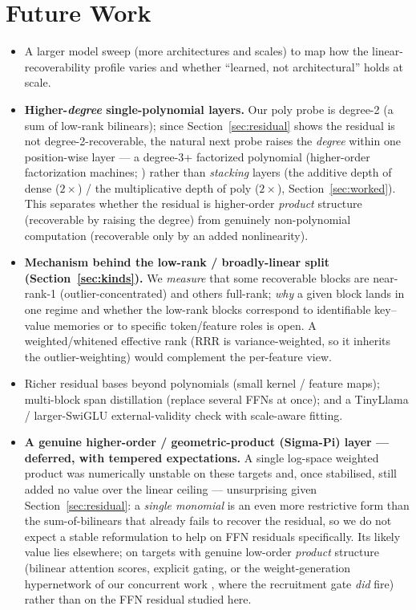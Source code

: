 \documentclass{article}
\begin{document}
\section{Future Work}
\label{sec:future}

\begin{itemize}
\item A larger model sweep (more architectures and scales) to map how the linear-recoverability
  profile varies and whether ``learned, not architectural'' holds at scale.
\item \textbf{Higher-\emph{degree} single-polynomial layers.} Our poly probe is degree-2 (a sum of
  low-rank bilinears); since Section~\ref{sec:residual} shows the residual is not degree-2-recoverable,
  the natural next probe raises the \emph{degree} within one position-wise layer --- a degree-3+
  factorized polynomial (higher-order factorization machines; \citealp{blondel2016hofm}) rather than
  \emph{stacking} layers (the additive depth of dense ($2\times$) / the multiplicative depth of poly
  ($2\times$), Section~\ref{sec:worked}). This separates whether the residual is higher-order
  \emph{product} structure (recoverable by raising the degree) from genuinely non-polynomial
  computation (recoverable only by an added nonlinearity).
\item \textbf{Mechanism behind the low-rank / broadly-linear split (Section~\ref{sec:kinds}).} We
  \emph{measure} that some recoverable blocks are near-rank-1 (outlier-concentrated) and others
  full-rank; \emph{why} a given block lands in one regime and whether the low-rank blocks
  correspond to identifiable key--value memories \citep{geva2021kv} or to specific token/feature
  roles is open. A weighted/whitened effective rank (RRR is variance-weighted, so it inherits the
  outlier-weighting) would complement the per-feature view.
\item Richer residual bases beyond polynomials (small kernel / feature maps); multi-block span
  distillation (replace several FFNs at once); and a TinyLlama / larger-SwiGLU external-validity check
  with scale-aware fitting.
\item \textbf{A genuine higher-order / geometric-product (Sigma-Pi) layer --- deferred, with tempered
  expectations.} A single log-space weighted product was numerically unstable on these targets and,
  once stabilised, still added no value over the linear ceiling --- unsurprising given
  Section~\ref{sec:residual}: a \emph{single monomial} is an even more restrictive form than the
  sum-of-bilinears that already fails to recover the residual, so we do not expect a stable
  reformulation to help on FFN residuals specifically. Its likely value lies elsewhere; on targets
  with genuine low-order \emph{product} structure (bilinear attention scores, explicit gating, or the
  weight-generation hypernetwork of our concurrent work \citep{whipp2026pi}, where the recruitment
  gate \emph{did} fire) rather than on the FFN residual studied here.
\end{itemize}
\end{document}
